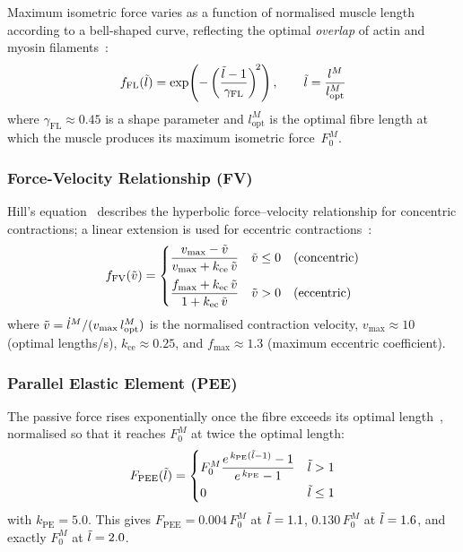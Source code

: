 Maximum isometric force varies as a function of normalised muscle length according
to a bell-shaped curve, reflecting the optimal \textit{overlap} of actin and myosin
filaments~\parencite{Gordon1966}:
\begin{equation}
  f_\text{FL}(\tilde{l}) = \exp\!\left(-\left(\frac{\tilde{l} - 1}{\gamma_\text{FL}}\right)^{\!2}\right),
  \qquad \tilde{l} = \frac{l^M}{l^M_\text{opt}}
  \label{eq:fl}
\end{equation}
where $\gamma_\text{FL} \approx 0.45$ is a shape parameter and $l^M_\text{opt}$ is
the optimal fibre length at which the muscle produces its maximum isometric
force~$F_0^M$.

\subsubsection{Force-Velocity Relationship (FV)}

Hill's equation~\parencite{Hill1938} describes the hyperbolic force--velocity
relationship for concentric contractions; a linear extension is used for eccentric
contractions~\parencite{Zajac1989}:
\begin{equation}
  f_\text{FV}(\tilde{v}) =
  \begin{cases}
    \dfrac{v_\text{max} - \tilde{v}}{v_\text{max} + k_\text{ce}\,\tilde{v}}
      & \tilde{v} \leq 0 \quad \text{(concentric)} \\[10pt]
    \dfrac{f_\text{max} + k_\text{ec}\,\tilde{v}}{1 + k_\text{ec}\,\tilde{v}}
      & \tilde{v} > 0 \quad \text{(eccentric)}
  \end{cases}
  \label{eq:fv}
\end{equation}
where $\tilde{v} = \dot{l}^M / (v_\text{max}\,l^M_\text{opt})$ is the normalised
contraction velocity, $v_\text{max} \approx 10$ (optimal lengths/s),
$k_\text{ce} \approx 0.25$, and $f_\text{max} \approx 1.3$ (maximum eccentric
coefficient).

\subsubsection{Parallel Elastic Element (PEE)}

The passive force rises exponentially once the fibre exceeds its optimal
length~\parencite{Zajac1989}, normalised so that it reaches $F_0^M$ at twice the
optimal length:
\begin{equation}
  F_\text{PEE}(\tilde{l}) =
  \begin{cases}
    F_0^M \dfrac{e^{\,k_\text{PE}(\tilde{l} - 1)} - 1}{e^{\,k_\text{PE}} - 1}
      & \tilde{l} > 1 \\[6pt]
    0 & \tilde{l} \leq 1
  \end{cases}
  \label{eq:pee}
\end{equation}
with $k_\text{PE} = 5.0$. This gives $F_\text{PEE} = 0.004\,F_0^M$ at
$\tilde{l} = 1.1$, $0.130\,F_0^M$ at $\tilde{l} = 1.6$, and exactly $F_0^M$ at
$\tilde{l} = 2.0$.

